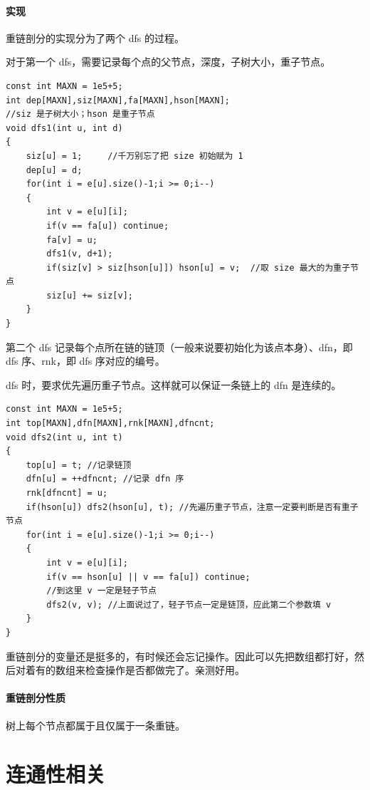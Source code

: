 \documentclass[11pt,oneside,a4paper,UTF8]{book}
\begin{document}
	\subsubsection{实现}
	重链剖分的实现分为了两个 dfs 的过程。\par
	对于第一个 dfs，需要记录每个点的父节点，深度，子树大小，重子节点。
	\begin{lstlisting}
const int MAXN = 1e5+5;
int dep[MAXN],siz[MAXN],fa[MAXN],hson[MAXN];
//siz 是子树大小；hson 是重子节点
void dfs1(int u, int d)
{
	siz[u] = 1;		//千万别忘了把 size 初始赋为 1
	dep[u] = d;
	for(int i = e[u].size()-1;i >= 0;i--)
	{
		int v = e[u][i];
		if(v == fa[u]) continue;
		fa[v] = u;
		dfs1(v, d+1);
		if(siz[v] > siz[hson[u]]) hson[u] = v;	//取 size 最大的为重子节点
		siz[u] += siz[v];
	}
}
	\end{lstlisting}\par
	第二个 dfs 记录每个点所在链的链顶（一般来说要初始化为该点本身）、dfn，即 dfs 序、rnk，即 dfs 序对应的编号。\par
	dfs 时，要求优先遍历重子节点。这样就可以保证一条链上的 dfn 是连续的。
	\begin{lstlisting}
const int MAXN = 1e5+5;
int top[MAXN],dfn[MAXN],rnk[MAXN],dfncnt;
void dfs2(int u, int t)
{
	top[u] = t; //记录链顶
	dfn[u] = ++dfncnt; //记录 dfn 序
	rnk[dfncnt] = u;
	if(hson[u]) dfs2(hson[u], t); //先遍历重子节点，注意一定要判断是否有重子节点
	for(int i = e[u].size()-1;i >= 0;i--)
	{
		int v = e[u][i];
		if(v == hson[u] || v == fa[u]) continue;
		//到这里 v 一定是轻子节点
		dfs2(v, v); //上面说过了，轻子节点一定是链顶，应此第二个参数填 v
	}
}
	\end{lstlisting}\par
	重链剖分的变量还是挺多的，有时候还会忘记操作。因此可以先把数组都打好，然后对着有的数组来检查操作是否都做完了。亲测好用。
	\subsubsection{重链剖分性质}
	树上每个节点都属于且仅属于一条重链。\par
	
	
	
	\chapter{连通性相关}
\end{document}
